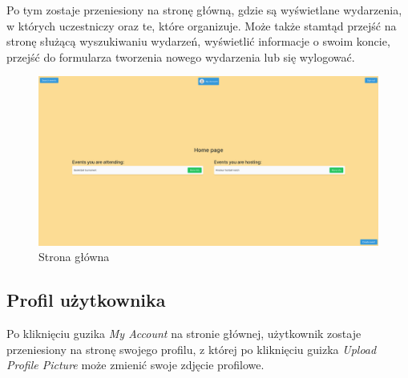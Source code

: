 \documentclass[11pt,a4paper]{article}
\begin{document}
Po tym zostaje przeniesiony na stronę główną, gdzie są wyświetlane wydarzenia, w których uczestniczy oraz te, które organizuje. Może także stamtąd przejść na stronę służącą wyszukiwaniu wydarzeń, wyświetlić informacje o swoim koncie, przejść do formularza tworzenia nowego wydarzenia lub się wylogować.

\begin{figure} [H]
    \centering
    \includegraphics[width=1\linewidth]{pages/home.png}
    \caption{Strona główna}
\end{figure}

\subsection{Profil użytkownika}

Po kliknięciu guzika \textit{My Account} na stronie głównej, użytkownik zostaje przeniesiony na stronę swojego profilu, z której po kliknięciu guizka \textit{Upload Profile Picture} może zmienić swoje zdjęcie profilowe.
\end{document}
